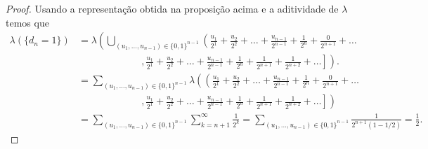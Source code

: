 \begin{proof}
Usando a representação obtida na proposição acima e 
a aditividade de $\lambda$ temos que 
%
	\begin{align*}
		\lambda(\{d_n=1\})
		&=
		\lambda
		\left(		
			\bigcup_{(u_1,\ldots,u_{n-1})\in\{0,1\}^{n-1}}
			\left(
				\frac{u_1}{2^1}
				+\frac{u_2}{2^2}
				+\ldots+\frac{u_{n-1}}{2^{n-1}}+\frac{1}{2^{n}}
				+\frac{0}{2^{n+1}}+\ldots
			\right.
		\right.
		\\
		&\qquad\qquad\qquad
		\ \ \mathbf{,} 
		\left.
			\left.
				\frac{u_1}{2^1}+\frac{u_2}{2^2}
				+\ldots+\frac{u_{n-1}}{2^{n-1}}+\frac{1}{2^{n}}
				+\frac{1}{2^{n+1}}+\frac{1}{2^{n+2}}
				+\ldots
			\right]
		\right).
		\\[0.8cm]
%
%
		&=
		\sum_{(u_1,\ldots,u_{n-1})\in\{0,1\}^{n-1}}
		\lambda
		\left(		
			\left(
				\frac{u_1}{2^1}
				+\frac{u_2}{2^2}
				+\ldots+\frac{u_{n-1}}{2^{n-1}}+\frac{1}{2^{n}}
				+\frac{0}{2^{n+1}}+\ldots
			\right.
		\right.
		\\
		&\qquad\qquad\qquad
		\ \ \mathbf{,} 
		\left.
			\left.
				\frac{u_1}{2^1}+\frac{u_2}{2^2}
				+\ldots+\frac{u_{n-1}}{2^{n-1}}+\frac{1}{2^{n}}
				+\frac{1}{2^{n+1}}+\frac{1}{2^{n+2}}
				+\ldots
			\right]
		\right)
		\\[0.8cm]
%
%
		&=
		\sum_{(u_1,\ldots,u_{n-1})\in\{0,1\}^{n-1}}
		\sum_{k=n+1}^{\infty} \frac{1}{2^k}
		=
		\sum_{(u_1,\ldots,u_{n-1})\in\{0,1\}^{n-1}}
		\frac{1}{2^{n+1}(1-1/2)}
		=\frac{1}{2}.
	\end{align*}




\end{proof}